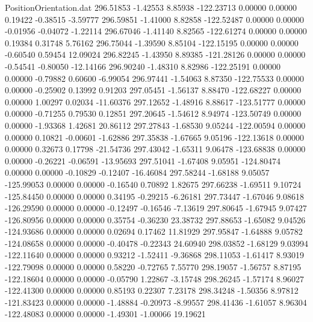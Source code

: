 \begin{filecontents}{PositionOrientation.dat}
 296.51853   -1.42553    8.85938  -122.23713    0.00000    0.00000    0.19422   -0.38515   -3.59777
 296.59851   -1.41000    8.82858  -122.52487    0.00000    0.00000   -0.01956   -0.04072   -1.22114
 296.67046   -1.41140    8.82565  -122.61274    0.00000    0.00000    0.19384    0.31748    5.76162
 296.75044   -1.39590    8.85104  -122.15195    0.00000    0.00000   -0.60540    0.59454   12.09024
 296.82245   -1.43950    8.89385  -121.28126    0.00000    0.00000   -0.54541   -0.80050  -12.14166
 296.90240   -1.48310    8.82986  -122.25191    0.00000    0.00000   -0.79882    0.60600   -6.99054
 296.97441   -1.54063    8.87350  -122.75533    0.00000    0.00000   -0.25902    0.13992    0.91203
 297.05451   -1.56137    8.88470  -122.68227    0.00000    0.00000    1.00297    0.02034  -11.60376
 297.12652   -1.48916    8.88617  -123.51777    0.00000    0.00000   -0.71255    0.79530    0.12851
 297.20645   -1.54612    8.94974  -123.50749    0.00000    0.00000   -1.93368    1.42681   20.86112
 297.27843   -1.68530    9.05244  -122.00594    0.00000    0.00000    0.10821   -0.00601   -1.62886
 297.35838   -1.67665    9.05196  -122.13618    0.00000    0.00000    0.32673    0.17798  -21.54736
 297.43042   -1.65311    9.06478  -123.68838    0.00000    0.00000   -0.26221   -0.06591  -13.95693
 297.51041   -1.67408    9.05951  -124.80474    0.00000    0.00000   -0.10829   -0.12407  -16.46084
 297.58244   -1.68188    9.05057  -125.99053    0.00000    0.00000   -0.16540    0.70892    1.82675
 297.66238   -1.69511    9.10724  -125.84450    0.00000    0.00000    0.34195   -0.29215   -6.26181
 297.73447   -1.67046    9.08618  -126.29590    0.00000    0.00000   -0.12497   -0.16546   -7.13619
 297.80645   -1.67945    9.07427  -126.80956    0.00000    0.00000    0.35754   -0.36230   23.38732
 297.88653   -1.65082    9.04526  -124.93686    0.00000    0.00000    0.02694    0.17462   11.81929
 297.95847   -1.64888    9.05782  -124.08658    0.00000    0.00000   -0.40478   -0.22343   24.60940
 298.03852   -1.68129    9.03994  -122.11640    0.00000    0.00000    0.93212   -1.52411   -9.36868
 298.11053   -1.61417    8.93019  -122.79098    0.00000    0.00000    0.58220   -0.72765    7.55770
 298.19057   -1.56757    8.87195  -122.18604    0.00000    0.00000   -0.05790    1.22867   -3.15748
 298.26245   -1.57174    8.96027  -122.41300    0.00000    0.00000    0.85193    0.22307    7.23178
 298.34248   -1.50356    8.97812  -121.83423    0.00000    0.00000   -1.48884   -0.20973   -8.99557
 298.41436   -1.61057    8.96304  -122.48083    0.00000    0.00000   -1.49301   -1.00066   19.19621

\end{filecontents}
